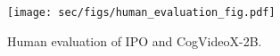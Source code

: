 \begin{figure}[!t]

    \centering
    \texttt{[image: sec/figs/human\_evaluation\_fig.pdf]}
    \vspace{-3mm}
    \caption{Human evaluation of IPO and CogVideoX-2B.}
    \label{fig:human_evaltion}
    \vspace{-5mm}
\end{figure}